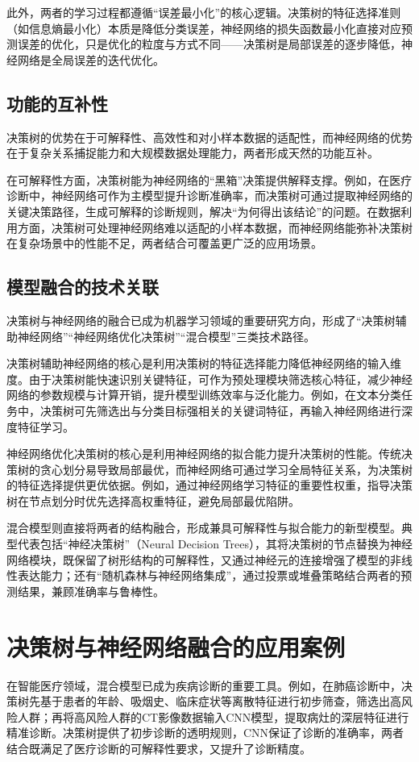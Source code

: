 此外，两者的学习过程都遵循“误差最小化”的核心逻辑。决策树的特征选择准则（如信息熵最小化）本质是降低分类误差，神经网络的损失函数最小化直接对应预测误差的优化，只是优化的粒度与方式不同——决策树是局部误差的逐步降低，神经网络是全局误差的迭代优化。

\subsection*{功能的互补性}
决策树的优势在于可解释性、高效性和对小样本数据的适配性，而神经网络的优势在于复杂关系捕捉能力和大规模数据处理能力，两者形成天然的功能互补。

在可解释性方面，决策树能为神经网络的“黑箱”决策提供解释支撑。例如，在医疗诊断中，神经网络可作为主模型提升诊断准确率，而决策树可通过提取神经网络的关键决策路径，生成可解释的诊断规则，解决“为何得出该结论”的问题。在数据利用方面，决策树可处理神经网络难以适配的小样本数据，而神经网络能弥补决策树在复杂场景中的性能不足，两者结合可覆盖更广泛的应用场景。

\subsection*{模型融合的技术关联}
决策树与神经网络的融合已成为机器学习领域的重要研究方向，形成了“决策树辅助神经网络”“神经网络优化决策树”“混合模型”三类技术路径。

决策树辅助神经网络的核心是利用决策树的特征选择能力降低神经网络的输入维度。由于决策树能快速识别关键特征，可作为预处理模块筛选核心特征，减少神经网络的参数规模与计算开销，提升模型训练效率与泛化能力。例如，在文本分类任务中，决策树可先筛选出与分类目标强相关的关键词特征，再输入神经网络进行深度特征学习。

神经网络优化决策树的核心是利用神经网络的拟合能力提升决策树的性能。传统决策树的贪心划分易导致局部最优，而神经网络可通过学习全局特征关系，为决策树的特征选择提供更优依据。例如，通过神经网络学习特征的重要性权重，指导决策树在节点划分时优先选择高权重特征，避免局部最优陷阱。

混合模型则直接将两者的结构融合，形成兼具可解释性与拟合能力的新型模型。典型代表包括“神经决策树”（Neural Decision Trees），其将决策树的节点替换为神经网络模块，既保留了树形结构的可解释性，又通过神经元的连接增强了模型的非线性表达能力；还有“随机森林与神经网络集成”，通过投票或堆叠策略结合两者的预测结果，兼顾准确率与鲁棒性。

\section*{决策树与神经网络融合的应用案例}
在智能医疗领域，混合模型已成为疾病诊断的重要工具。例如，在肺癌诊断中，决策树先基于患者的年龄、吸烟史、临床症状等离散特征进行初步筛查，筛选出高风险人群；再将高风险人群的CT影像数据输入CNN模型，提取病灶的深层特征进行精准诊断。决策树提供了初步诊断的透明规则，CNN保证了诊断的准确率，两者结合既满足了医疗诊断的可解释性要求，又提升了诊断精度。

